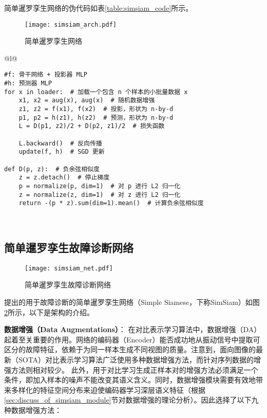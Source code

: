 \documentclass[master]{thesis-uestc}
\begin{document}
简单暹罗孪生网络的伪代码如表\ref{table:simsiam_code}所示。

\begin{figure}[h]
    \texttt{[image: simsiam\_arch.pdf]}
    \caption{简单暹罗孪生网络}
    \label{simsiam_arch}
\end{figure}

\begin{table}
    \caption{简单暹罗孪生网络的伪代码，用Pytorch描述}
    \begin{tabular}{@{}l@{}} %
    \toprule
     \\ %
    \midrule
    \begin{lstlisting}[basicstyle=\ttfamily,frame=none]
#f: 骨干网络 + 投影器 MLP
#h: 预测器 MLP
for x in loader:  # 加载一个包含 n 个样本的小批量数据 x
    x1, x2 = aug(x), aug(x)  # 随机数据增强
    z1, z2 = f(x1), f(x2)  # 投影，形状为 n-by-d
    p1, p2 = h(z1), h(z2)  # 预测，形状为 n-by-d
    L = D(p1, z2)/2 + D(p2, z1)/2  # 损失函数

    L.backward()  # 反向传播
    update(f, h)  # SGD 更新

def D(p, z):  # 负余弦相似度
    z = z.detach()  # 停止梯度
    p = normalize(p, dim=1)  # 对 p 进行 L2 归一化
    z = normalize(z, dim=1)  # 对 z 进行 L2 归一化
    return -(p * z).sum(dim=1).mean()  # 计算负余弦相似度
    \end{lstlisting} \\
    \bottomrule
    \end{tabular}
    \label{table:simsiam_code}
\end{table}
\subsection{简单暹罗孪生故障诊断网络}
\begin{figure}[h]
    \centering
    \texttt{[image: simsiam\_net.pdf]}
    \caption{简单暹罗孪生故障诊断网络}
    \label{simsiam_net}
\end{figure}
提出的用于故障诊断的简单暹罗孪生网络（Simple Siamese，下称SimSiam）如图\ref{simsiam_net}所示，以下是架构的介绍。

\textbf{数据增强（Data Augmentations）}：
在对比表示学习算法中，数据增强（DA）起着至关重要的作用。网络的编码器（Encoder）能否成功地从振动信号中提取可区分的故障特征，依赖于为同一样本生成不同视图的质量。注意到，面向图像的最新（SOTA）对比表示学习算法广泛使用多种数据增强方法，而针对序列数据的增强方法则相对较少。
此外，用于对比学习生成正样本对的增强方法必须满足一个条件，即加入样本的噪声不能改变其语义含义。同时，数据增强模块需要有效地带来多样化的特征空间分布来迫使编码器学习深层语义特征（根据\ref{sec:discuss_of_simsiam_module}节对数据增强的理论分析）。因此选择了以下九种数据增强方法：
\end{document}
